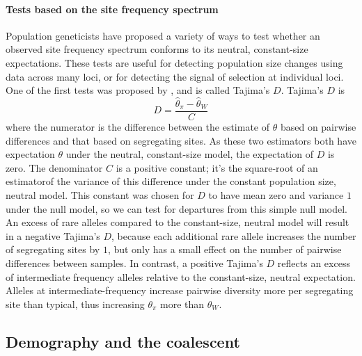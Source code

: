 \paragraph{Tests based on the site frequency spectrum}
Population geneticists have proposed a variety of ways to test whether an observed site frequency spectrum conforms to its
neutral, constant-size expectations. These tests are
useful for detecting population size changes using data across many loci, or
for detecting the signal of selection at individual loci. One of
the first tests was proposed by \citep{tajima:89}, and is called
Tajima's $D$. Tajima's $D$ is
\begin{equation}
  D = \frac{\hat{\theta}_{\pi}-\hat{\theta}_{W}}{C} \label{eqn_Tajimas_D}
\end{equation}
where the numerator is the difference between the estimate of
$\theta$ based on pairwise differences and that based on segregating
sites. As these two estimators both have expectation $\theta$ under
the neutral, constant-size model, the expectation of $D$ is zero. The denominator $C$ is a positive constant; it's the square-root of an estimatorof the variance of this difference under the constant population size, neutral model. This constant was chosen for $D$ to have mean zero and variance $1$ under the null model, so we can test for  departures from this simple null model.\\

An excess of rare alleles compared to the constant-size, neutral
model will result in a negative Tajima's $D$, because each
additional rare allele increases the number of segregating sites by
$1$, but only has a small effect on the number of pairwise differences between samples.
In contrast, a positive Tajima's $D$ reflects an excess of intermediate frequency alleles relative to the constant-size, neutral expectation. Alleles at intermediate-frequency increase pairwise diversity
more per segregating site than typical, thus increasing $\theta_{\pi}$ more than $\theta_{W}$.

\subsection{Demography and the coalescent}

